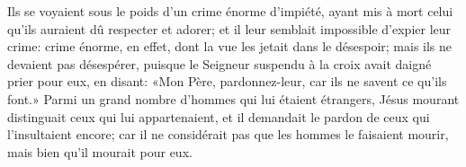  Ils se voyaient sous le poids d’un crime énorme d’impiété,
	ayant mis à mort celui qu’ils auraient dû respecter et adorer;
	et il leur semblait impossible d’expier leur crime:
	crime énorme, en effet, dont la vue les jetait dans le désespoir;
	mais ils ne devaient pas désespérer,
	puisque le Seigneur suspendu à la croix avait daigné prier pour eux,
	en disant: «Mon Père, pardonnez-leur, car ils ne savent ce qu’ils font.»
Parmi un grand nombre d’hommes qui lui étaient étrangers,
	Jésus mourant distinguait ceux qui lui appartenaient,
	et il demandait le pardon de ceux qui l’insultaient encore;
	car il ne considérait pas que les hommes le faisaient mourir,
	mais bien qu’il mourait pour eux.